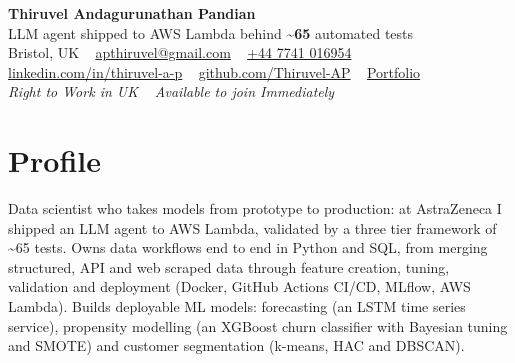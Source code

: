 \documentclass[a4paper,11pt]{article}
\newcommand{\num}[1]{\textbf{#1}}   %
\begin{document}
\begin{center}
  {\fontsize{22}{26}\selectfont\bfseries\color{navy} Thiruvel Andagurunathan Pandian}\\[4pt]
  {\fontsize{12}{14}\selectfont\color{navy} LLM agent shipped to AWS Lambda behind \num{\textasciitilde{}65} automated tests}\\[4pt]
  {\small
  Bristol, UK\nobreak\ \,\textperiodcentered\, \href{mailto:apthiruvel@gmail.com}{apthiruvel@gmail.com}\nobreak\ \,\textperiodcentered\, \href{tel:+447741016954}{+44 7741 016954}\nobreak\ \,\textperiodcentered\, \href{https://www.linkedin.com/in/thiruvel-a-p/}{linkedin.com/in/thiruvel-a-p}\nobreak\ \,\textperiodcentered\, \href{https://github.com/Thiruvel-AP}{github.com/Thiruvel-AP}\nobreak\ \,\textperiodcentered\, \href{https://thiruvel-ap.github.io/PersonalPortfolio/}{Portfolio}}\\[3pt]
  {\small\itshape\color{muted} Right to Work in UK\nobreak\ \,\textperiodcentered\, Available to join Immediately}

\end{center}

\section{Profile}
Data scientist who takes models from prototype to production: at AstraZeneca I shipped an LLM agent to AWS Lambda, validated by a three tier framework of \textasciitilde{}65 tests. Owns data workflows end to end in Python and SQL, from merging structured, API and web scraped data through feature creation, tuning, validation and deployment (Docker, GitHub Actions CI/CD, MLflow, AWS Lambda). Builds deployable ML models: forecasting (an LSTM time series service), propensity modelling (an XGBoost churn classifier with Bayesian tuning and SMOTE) and customer segmentation (k-means, HAC and DBSCAN).
\end{document}
